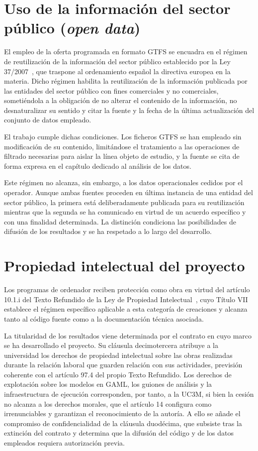 \section{Uso de la información del sector público (\textit{open data})}

El empleo de la oferta programada en formato GTFS se encuadra en el régimen de reutilización
de la información del sector público establecido por la Ley 37/2007~\cite{ley37_2007}, que
traspone al ordenamiento español la directiva europea en la materia. Dicho régimen habilita
la reutilización de la información publicada por las entidades del sector público con fines
comerciales y no comerciales, sometiéndola a la obligación de no alterar el contenido de la
información, no desnaturalizar su sentido y citar la fuente y la fecha de la última
actualización del conjunto de datos empleado.

El trabajo cumple dichas condiciones. Los ficheros GTFS se han empleado sin modificación de
su contenido, limitándose el tratamiento a las operaciones de filtrado necesarias para
aislar la línea objeto de estudio, y la fuente se cita de forma expresa en el capítulo
dedicado al análisis de los datos.

Este régimen no alcanza, sin embargo, a los datos operacionales cedidos por el operador.
Aunque ambas fuentes proceden en última instancia de una entidad del sector público, la
primera está deliberadamente publicada para su reutilización mientras que la segunda se ha
comunicado en virtud de un acuerdo específico y con una finalidad determinada. La distinción
condiciona las posibilidades de difusión de los resultados y se ha respetado a lo largo del
desarrollo.

\section{Propiedad intelectual del proyecto}

Los programas de ordenador reciben protección como obra en virtud del artículo 10.1.i del
Texto Refundido de la Ley de Propiedad Intelectual~\cite{trlpi}, cuyo Título VII establece
el régimen específico aplicable a esta categoría de creaciones y alcanza tanto al código
fuente como a la documentación técnica asociada.

La titularidad de los resultados viene determinada por el contrato en cuyo marco se ha
desarrollado el proyecto. Su cláusula decimotercera atribuye a la universidad los derechos de
propiedad intelectual sobre las obras realizadas durante la relación laboral que guarden
relación con sus actividades, previsión coherente con el artículo 97.4 del propio Texto
Refundido. Los derechos de explotación sobre los modelos en GAML, los guiones de análisis y
la infraestructura de ejecución corresponden, por tanto, a la UC3M, si bien la cesión no
alcanza a los derechos morales, que el artículo 14 configura como irrenunciables y garantizan
el reconocimiento de la autoría. A ello se añade el compromiso de confidencialidad de la
cláusula duodécima, que subsiste tras la extinción del contrato y determina que la difusión
del código y de los datos empleados requiera autorización previa.

